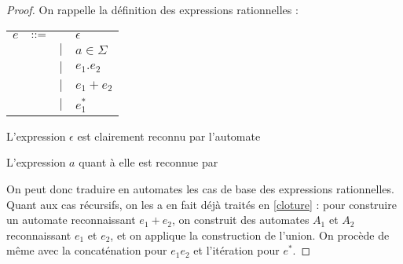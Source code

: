 \begin{proof}
On rappelle la définition des expressions rationnelles : 

\begin{tabular}{cccl}
$e$ & $\textcolor{black}{::=}$ & & $\epsilon$\\
& & $|$&  $a \in \Sigma$\\
& & $|$&  $e_1.e_2$\\
& & $|$&  $e_1+e_2$\\
& & $|$&  $e_1^*$\\
\end{tabular}

L'expression $\epsilon$ est clairement reconnu par l'automate 


\begin{figure}[H]
\centering
{}
\end{figure}

L'expression $a$ quant à elle est reconnue par 


\begin{figure}[H]
\centering
{}
\end{figure}

On peut donc traduire en automates les cas de base des expressions rationnelles. Quant aux cas récursifs, on les a en fait déjà traités en \ref{cloture} : pour construire un automate reconnaissant $e_1 + e_2$, on construit des automates $A_1$ et $A_2$ reconnaissant $e_1$ et $e_2$, et on applique la construction de l'union. On procède de même avec la concaténation pour $e_1e_2$ et l'itération pour $e^*$.
\end{proof}

